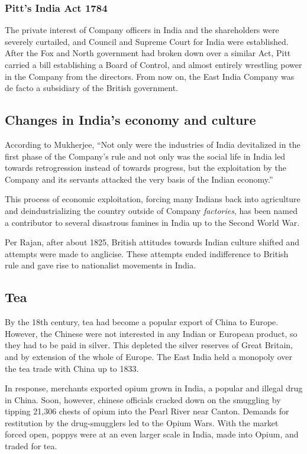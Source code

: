 \documentclass[11pt, a4paper, headings=standardclasses]{scrartcl}
\begin{document}
\subsubsection{Pitt's India Act 1784}

The private interest of Company officers in India and the shareholders were severely curtailed, and Council and Supreme Court for India were established. After the Fox and North government had broken down over a similar Act, Pitt carried a bill establishing a Board of Control, and almost entirely wrestling power in the Company from the directors. From now on, the East India Company was de facto a subsidiary of the British government.\autocite[396]{RF, parliament}

\subsection{Changes in India's economy and culture}
 According to Mukherjee, ``Not only were the industries of India devitalized in the first phase of the Company's rule and not only was the social life in India led towards retrogression instead of towards progress, but the exploitation by the Company and its servants attacked the very basis of the Indian economy.''\autocite[335]{RF}
 
This process of economic exploitation, forcing many Indians back into agriculture and deindustrializing the country outside of Company \textit{factories}, has been named a contributor to several disastrous famines in India up to the Second World War.\autocite[Section III]{tnr}

Per Rajan, after about 1825, British attitudes towards Indian culture shifted and attempts were made to anglicise. These attempts ended indifference to British rule and gave rise to nationalist movements in India.\autocite[90]{rajan}

\subsection{Tea}

By the 18th century, tea had become a popular export of China to Europe. However, the Chinese were not interested in any Indian or European product, so they had to be paid in silver. This depleted the silver reserves of Great Britain, and by extension of the whole of Europe.\autocite[214]{Tea} The East India held a monopoly over the tea trade with China up to 1833\autocite{parliament}.

In response, merchants exported opium grown in India, a popular and illegal drug in China.\autocite[215]{Tea} Soon, however, chinese officials cracked down on the smuggling by tipping 21,306 chests of opium into the Pearl River near Canton.\autocite[203]{Tea} Demands for restitution by the drug-smugglers led to the Opium Wars.\autocite{Opium} With the market forced open, poppys were at an even larger scale in India, made into Opium, and traded for tea.\autocite[218-219]{Tea}\label{tea}
\end{document}
